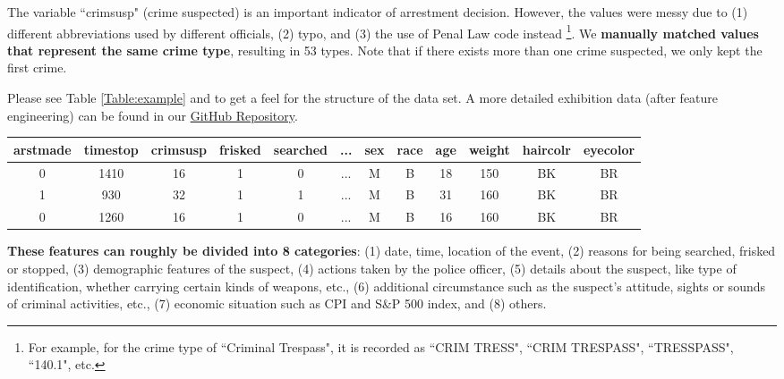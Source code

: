The variable ``crimsusp" (crime suspected) is an important indicator of arrestment decision. However, the values were messy due to (1) different abbreviations used by different officials, (2) typo, and (3) the use of Penal Law code instead \footnote{For example, for the crime type of ``Criminal Trespass", it is recorded as ``CRIM TRESS", ``CRIM TRESPASS", ``TRESSPASS", ``140.1", etc.}. We \textbf{manually matched values that represent the same crime type}, resulting in 53 types. Note that if there exists more than one crime suspected, we only kept the first crime.

Please see Table \ref{Table:example} and to get a feel for the structure of the data set. A more detailed exhibition data (after feature engineering) can be found in our \href{https://github.com/Apairery/ORIE4741-ArrestsDataSet/blob/master/data/data_used.csv}{GitHub Repository}.


\begin{table*}[htbp] \small
    \centering
    \begin{tabular}{cccccccccccc} \hline
    \textbf{arstmade} & \textbf{timestop} & \textbf{crimsusp} & \textbf{frisked} & \textbf{searched} & \textbf{...} & \textbf{sex} & \textbf{race} & \textbf{age} & \textbf{weight} & \textbf{haircolr} & \textbf{eyecolor} \\ \hline
    0                 & 1410              & 16                & 1                & 0                 & ...          & M            & B             & 18           & 150             & BK                & BR                \\
    1                 & 930               & 32                & 1                & 1                 & ...          & M            & B             & 31           & 160             & BK                & BR                \\
    0                 & 1260              & 16                & 1                & 0                 & ...          & M            & B             & 16           & 160             & BK                & BR         \\      \hline
    \end{tabular} 
    \caption{Data Set Example}
    \label{Table:example}
\end{table*}

\textbf{These features can roughly be divided into 8 categories}: (1) date, time, location of the event, (2) reasons for being searched, frisked or stopped, (3) demographic features of the suspect, (4) actions taken by the police officer, (5) details about the suspect, like type of identification, whether carrying certain kinds of weapons, etc., (6) additional circumstance such as the suspect's attitude, sights or sounds of criminal activities, etc., (7) economic situation such as CPI and S\&P 500 index, and (8) others.

